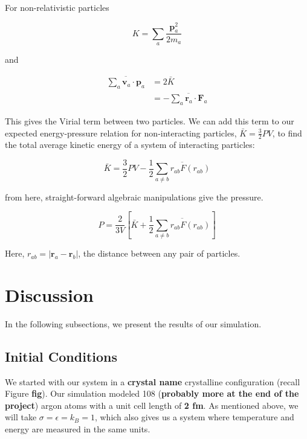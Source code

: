 \documentclass{article}
\begin{document}
\begin{multicols}{2}
\noindent  For non-relativistic particles 

\begin{equation}
K = \sum \limits _a \frac{\textbf{p}_{a}^2}{2m_a}
\end{equation}

\noindent and 

\begin{equation}
\begin{split}
\overline{\sum \limits _a \textbf{v}_a \cdot \textbf{p}_a} & = 2\bar{K} \\
& = - \overline{\sum \limits _a \textbf{r}_a \cdot \textbf{F}_a}
\end{split}
\end{equation}

\noindent This gives the Virial term between two particles.  We can add this term to our expected energy-pressure relation for non-interacting particles, $\bar{K}=\frac{3}{2}PV$, to find the total average kinetic energy of a system of interacting particles:  

\begin{equation}
\bar{K} = \frac{3}{2} PV - \frac{1}{2} \overline{\sum \limits _{a \ne b} r_{ab} F(r_{ab})}
\end{equation}

\noindent from here, straight-forward algebraic manipulations give the pressure.

\begin{equation}
P = \frac{2}{3V} \left [ \bar{K} + \frac{1}{2} \overline{\sum \limits _{a\ne b} r_{ab} F(r_{ab})} \right ]
\end{equation}

\noindent Here, $r_{ab} = |\textbf{r}_a - \textbf{r}_b|$, the distance between any pair of particles.

\section{Discussion}
\label{disc}
In the following subsections, we present the results of our simulation.

\subsection{Initial Conditions}

We started with our system in a \textbf{crystal name} crystalline configuration (recall Figure \textbf{fig}).  Our simulation modeled  108 (\textbf{probably more at the end of the project}) argon atoms with a unit cell length of \textbf{2 fm}.  As mentioned above, we will take $\sigma=\epsilon=k_B=1$, which also gives us a system where temperature and energy are measured in the same units.  


\end{multicols}
\end{document}
